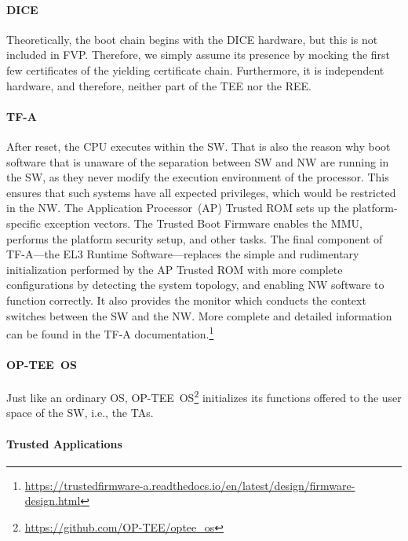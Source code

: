 


\paragraph{DICE}
Theoretically, the boot chain begins with the DICE hardware, but this is not included in FVP\@.
Therefore, we simply assume its presence by mocking the first few certificates of the yielding certificate chain.
Furthermore, it is independent hardware, and therefore, neither part of the TEE nor the REE\@.

\paragraph{TF-A}
After reset, the CPU executes within the \ac{SW}.
That is also the reason why boot software that is unaware of the separation between \ac{SW} and \ac{NW} are running in the \ac{SW}, as they never modify the execution environment of the processor.
This ensures that such systems have all expected privileges, which would be restricted in the \ac{NW}.
The Application Processor~(AP) Trusted ROM sets up the platform-specific exception vectors.
The Trusted Boot Firmware enables the MMU, performs the platform security setup, and other tasks.
The final component of TF-A---the EL3 Runtime Software---replaces the simple and rudimentary initialization performed by the AP Trusted ROM with more complete configurations by detecting the system topology, and enabling \ac{NW} software to function correctly.
It also provides the monitor which conducts the context switches between the \ac{SW} and the \ac{NW}.
More complete and detailed information can be found in the TF-A documentation.\footnote{\url{https://trustedfirmware-a.readthedocs.io/en/latest/design/firmware-design.html}}

\paragraph{OP-TEE~OS}
Just like an ordinary OS, OP-TEE~OS\footnote{\url{https://github.com/OP-TEE/optee_os}} initializes its functions offered to the user space of the \ac{SW}, i.e., the \acp{TA}.

\paragraph{Trusted Applications}

